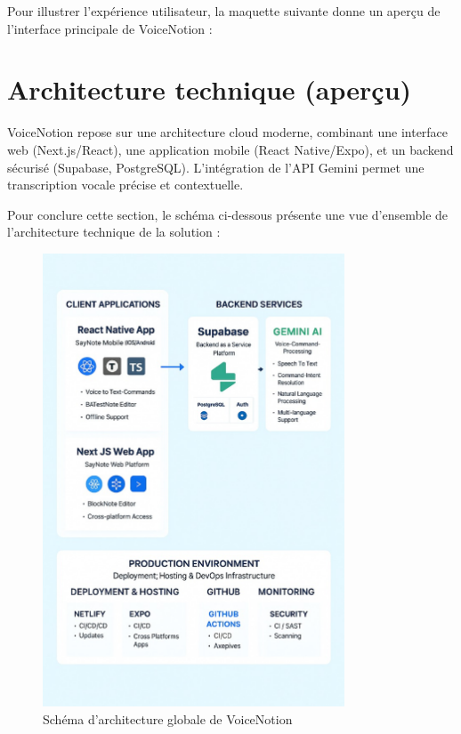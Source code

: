 Pour illustrer l’expérience utilisateur, la maquette suivante donne un aperçu de l’interface principale de VoiceNotion :

\section{Architecture technique (aperçu)}
VoiceNotion repose sur une architecture cloud moderne, combinant une interface web (Next.js/React), une application mobile (React Native/Expo), et un backend sécurisé (Supabase, PostgreSQL). L’intégration de l’API Gemini permet une transcription vocale précise et contextuelle.

Pour conclure cette section, le schéma ci-dessous présente une vue d’ensemble de l’architecture technique de la solution :

\begin{figure}[H]
    \centering
    \includegraphics[width=0.8\textwidth]{assets/docs/global_architecture.png}
    \caption{Schéma d’architecture globale de VoiceNotion}
    \label{fig:global-architecture}
\end{figure}

